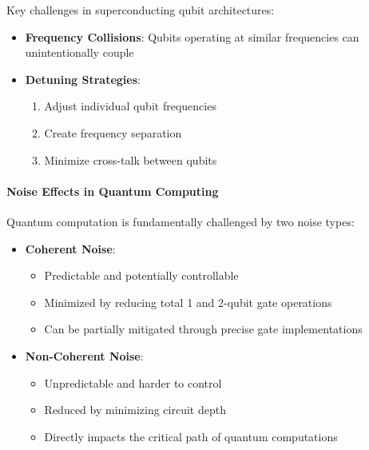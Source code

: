 
Key challenges in superconducting qubit architectures:

\begin{itemize}
  \item \textbf{Frequency Collisions}: Qubits operating at similar
    frequencies can unintentionally couple

  \item \textbf{Detuning Strategies}:
    \begin{enumerate}
      \item Adjust individual qubit frequencies
      \item Create frequency separation
      \item Minimize cross-talk between qubits
    \end{enumerate}
\end{itemize}

\paragraph{Noise Effects in Quantum Computing}
Quantum computation is fundamentally challenged by two noise types:

\begin{itemize}
  \item \textbf{Coherent Noise}:
    \begin{itemize}
      \item Predictable and potentially controllable
      \item Minimized by reducing total 1 and 2-qubit gate operations
      \item Can be partially mitigated through precise gate implementations
    \end{itemize}

  \item \textbf{Non-Coherent Noise}:
    \begin{itemize}
      \item Unpredictable and harder to control
      \item Reduced by minimizing circuit depth
      \item Directly impacts the critical path of quantum computations
    \end{itemize}
\end{itemize}

